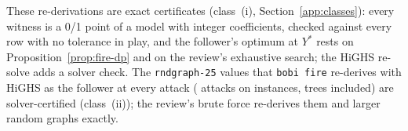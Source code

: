 These re-derivations are exact certificates (class~(i), Section~\ref{app:classes}):
every witness is a 0/1 point of a model with integer coefficients, checked
against every row with no tolerance in play, and the follower's optimum at
$Y^{*}$ rests on Proposition~\ref{prop:fire-dp} and on the review's exhaustive
search; the HiGHS re-solve adds a solver check. The \NetworkRndSmall{}
\texttt{rndgraph-25} values that \texttt{bobi fire} re-derives with HiGHS as the
follower at every attack (\SuppNetHighsAttacks{} attacks on
\SuppNetHighsInstances{} instances, trees included) are solver-certified
(class~(ii)); the review's brute force re-derives them and \NetworkReviewOnly{} larger random
graphs exactly.

